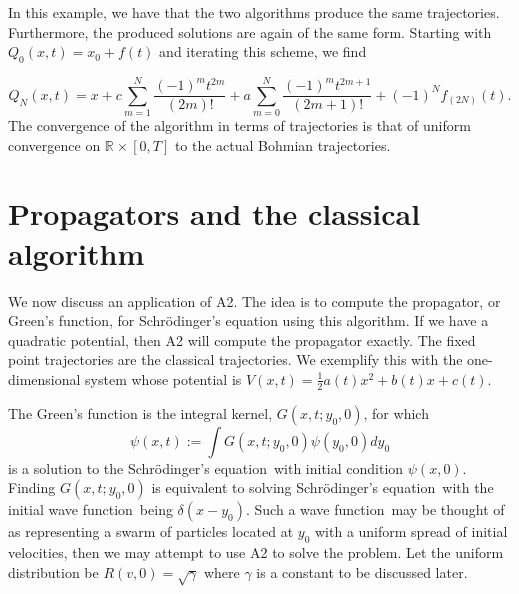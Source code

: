 \documentclass[11pt]{article}
\theoremstyle{remark}
\begin{document}
In this example, we have that the two algorithms produce the same
trajectories. Furthermore, the produced solutions are again of the
same form. Starting with $Q_0(x,t) =x_0 +f(t)$ and iterating this
scheme, we find


\[
Q_N (x,t) = x + 
c \sum_{m =1}^{N} \frac{(-1)^m t^{2m}}{(2m)!} +
a \sum_{m =0}^{N} \frac{(-1)^m t^{2m+1}}{(2m+1)!}
+ (-1)^Nf_{(2N)} (t)
.\]
The convergence of the algorithm in terms of trajectories is that of
uniform convergence on $\ensuremath{\mathbb{R}^{}}\times [0,T]$ to the actual Bohmian
trajectories. 


\section{Propagators and the classical algorithm}

We now discuss an application of A2. The idea is to compute the
propagator, or Green's function, for Schr\"odinger's equation 
using this algorithm. If we have a
quadratic potential, then A2 will compute the propagator exactly. The
fixed point trajectories are the classical trajectories. We exemplify
this with the one-dimensional system whose potential is 
 $V(x, t) = \frac{1}{2} a(t) x^2 + b(t) x +c(t)$. 


The Green's function is the integral kernel, $G(x, t; y_0,
0)$, for which 
\[
 \psi (x, t) \ensuremath{:=} \int G(x, t; y_0, 0) \psi(y_0, 0) dy_0
\] is a solution to the Schr\"odinger's equation\ with initial condition $\psi(x,0)$. 
Finding $G(x, t; y_0, 0)$ is equivalent to
solving Schr\"odinger's equation\ with the initial wave function\ being  $\delta (x - y_0)$.  Such a
wave function\ may be thought of as 
representing a swarm of particles located at $y_0$  with a uniform spread of
initial velocities, then we may attempt to use A2 to solve the
problem. Let the uniform distribution be $R(v,0) = \sqrt{\gamma}$
where $\gamma$ is a constant to be discussed later.
\end{document}
